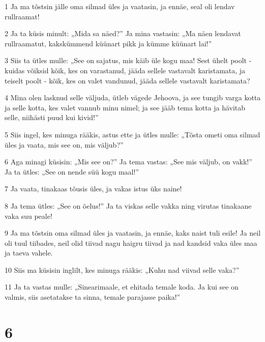\par 1 Ja ma tõstsin jälle oma silmad üles ja vaatasin, ja ennäe, seal oli lendav rullraamat!
\par 2 Ja ta küsis minult: „Mida sa näed?” Ja mina vastasin: „Ma näen lendavat rullraamatut, kakskümmend küünart pikk ja kümme küünart lai!”
\par 3 Siis ta ütles mulle: „See on sajatus, mis käib üle kogu maa! Sest ühelt poolt - kuidas võiksid kõik, kes on varastanud, jääda sellele vastavalt karistamata, ja teiselt poolt - kõik, kes on valet vandunud, jääda sellele vastavalt karistamata?
\par 4 Mina olen lasknud selle väljuda, ütleb vägede Jehoova, ja see tungib varga kotta ja selle kotta, kes valet vannub minu nimel; ja see jääb tema kotta ja hävitab selle, niihästi puud kui kivid!”
\par 5 Siis ingel, kes minuga rääkis, astus ette ja ütles mulle: „Tõsta ometi oma silmad üles ja vaata, mis see on, mis väljub?”
\par 6 Aga minagi küsisin: „Mis see on?” Ja tema vastas: „See mis väljub, on vakk!” Ja ta ütles: „See on nende süü kogu maal!”
\par 7 Ja vaata, tinakaas tõusis üles, ja vakas istus üks naine!
\par 8 Ja tema ütles: „See on õelus!” Ja ta viskas selle vakka ning virutas tinakaane vaka suu peale!
\par 9 Ja ma tõstsin oma silmad üles ja vaatasin, ja ennäe, kaks naist tuli esile! Ja neil oli tuul tiibades, neil olid tiivad nagu haigru tiivad ja nad kandsid vaka üles maa ja taeva vahele.
\par 10 Siis ma küsisin inglilt, kes minuga rääkis: „Kuhu nad viivad selle vaka?”
\par 11 Ja ta vastas mulle: „Sinearimaale, et ehitada temale koda. Ja kui see on valmis, siis asetatakse ta sinna, temale parajasse paika!”


\chapter{6}

